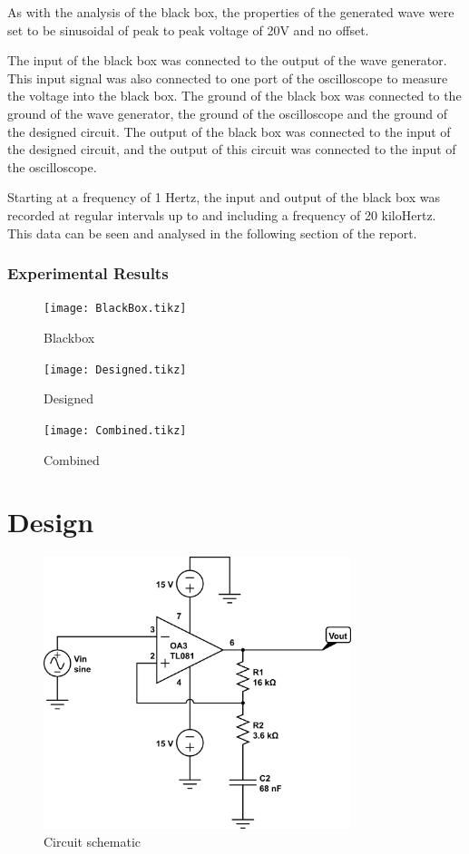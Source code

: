 \documentclass[12pt]{article} %
\begin{document}
As with the analysis of the black box, the properties of the generated wave were set to be sinusoidal of peak to peak voltage of 20V and no offset.

The input of the black box was connected to the output of the wave generator. This input signal was also connected to one port of the oscilloscope to measure the voltage into the black box. The ground of the black box was connected to the ground of the wave generator, the ground of the oscilloscope and the ground of the designed circuit. The output of the black box was connected to the input of the designed circuit, and the output of this circuit was connected to the input of the oscilloscope.

Starting at a frequency of 1 Hertz, the input and output of the black box was recorded at regular intervals up to and including a frequency of 20 kiloHertz. This data can be seen and analysed in the following section of the report.

\subsubsection{Experimental Results}

\begin{figure}
 	\centering
	\texttt{[image: BlackBox.tikz]}
	\caption{Blackbox}
\end{figure}

\begin{figure}
 	\centering
	\texttt{[image: Designed.tikz]}
	\caption{Designed}
\end{figure}

\begin{figure}
 	\centering
	\texttt{[image: Combined.tikz]}
	\caption{Combined}
\end{figure}

\pagebreak





\section{Design}

\begin{figure}
 	\centering
	\includegraphics[width=0.8\textwidth]{CircuitDiagram.png}
	\caption{Circuit schematic}
\end{figure}
\end{document}
